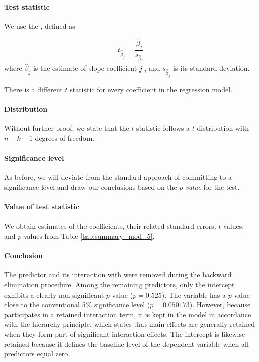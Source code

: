 \paragraph{Test statistic} We use the , defined as

\begin{equation}
  t_{\hat{\beta}_j} = \frac{\hat{\beta}_j}{s_{\hat{\beta}_j}}
\end{equation}
where $\hat{\beta}_j$ is the estimate of slope coefficient $j$ , and $s_{\hat{\beta}_j}$ is its standard deviation.

There is a different $t$ statistic for every coefficient in the regression model.

\paragraph{Distribution} Without further proof, we state that the $t$ statistic follows a $t$ distribution with $n-k-1$ degrees of freedom.

\paragraph{Significance level} As before, we will deviate from the standard approach of committing to a significance level and draw our conclusions based on the \emph{$p$ value} for the test.

\paragraph{Value of test statistic} We obtain estimates of the coefficients, their related standard errors, $t$ values, and $p$ values from Table \ref{tab:summary_mod_5}.

\paragraph{Conclusion}

The predictor  and its interaction with  were removed during the backward elimination procedure. 
Among the remaining predictors, only the intercept exhibits a clearly non-significant $p$ value ($p = 0.525$). 
The variable  has a $p$ value close to the conventional 5\% significance level ($p = 0.050173$). However, because  participates in a retained interaction term, it is kept in the model in accordance with the hierarchy principle, which states that main effects are generally retained when they form part of significant interaction effects. 
The intercept is likewise retained because it defines the baseline level of the dependent variable when all predictors equal zero.

